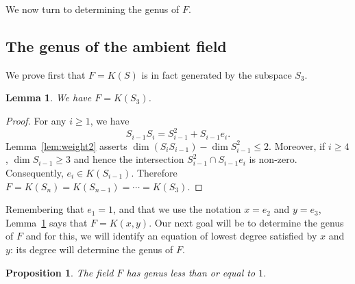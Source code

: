 \documentclass{article}
\theoremstyle{plain}
\newtheorem{lemma}[thm]{Lemma}
\newtheorem{prop}[thm]{Proposition}
\theoremstyle{definition}
\theoremstyle{remark}
\renewcommand{\geq}{\geqslant}
\renewcommand{\leq}{\leqslant}
\begin{document}
We now turn to determining the genus of $F$.

\subsection{The genus of the ambient field}\label{sec:genus}


We prove first that $F=K(S)$ is in fact generated by the subspace $S_3$.

  \begin{lemma}\label{lem:dimSiSi+1}
    We have $F = K(S_3)$.
  \end{lemma}
  \begin{proof}
    For any
    $i \geq 1$, we have
    $$
    S_{i-1} S_i  = S_{i-1}^2 +  S_{i-1} e_i.
    $$
    Lemma~\ref{lem:weight2} asserts
    $\dim (S_iS_{i-1}) - \dim S_{i-1}^2 \leq 2$. Moreover, if $i \geq 4$,
    $\dim S_{i-1} \geq 3$ and hence the intersection
    $S_{i-1}^2 \cap S_{i-1}e_i$ is non-zero.
    Consequently, $e_i \in K(S_{i-1})$. Therefore 
    $F=K(S_n)=K(S_{n-1})=\cdots =K(S_3)$.
  \end{proof}

Remembering that
$e_1=1$, and that we use the notation $x=e_2$ and $y=e_3$, 
Lemma~\ref{lem:dimSiSi+1} says that $F=K(x,y)$. Our next goal
will be to determine the genus of $F$ and for this, we will identify an equation of lowest degree satisfied by $x$ and $y$: its
degree will determine the genus of $F$. 
  
\begin{prop}\label{prop:genus}
  The field $F$ has genus less than or equal to $1$.
\end{prop}
\end{document}
